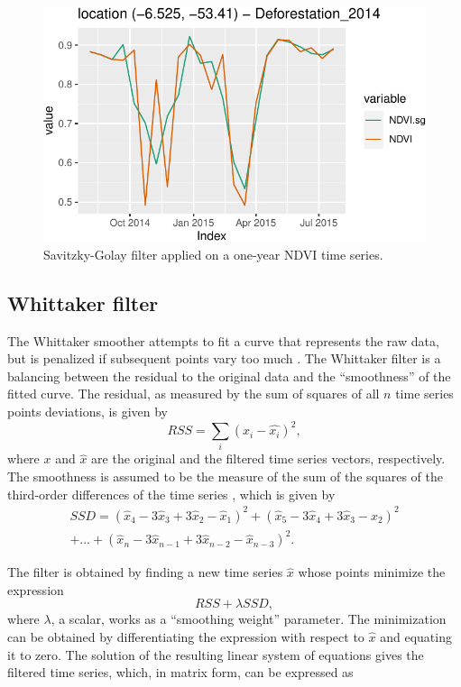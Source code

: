 \documentclass[a4paper,]{tufte-book}
\begin{document}
\begin{figure}

{\centering \includegraphics[width=0.7\linewidth]{sitsbook_files/figure-latex/unnamed-chunk-33-1} 

}

\caption[Savitzky-Golay filter applied on a one-year NDVI time series]{Savitzky-Golay filter applied on a one-year NDVI time series.}\label{fig:unnamed-chunk-33}
\end{figure}

\hypertarget{whittaker-filter}{%
\subsection{Whittaker filter}\label{whittaker-filter}}

The Whittaker smoother attempts to fit a curve that represents the raw data, but is penalized if subsequent points vary too much \citep{Atzberger2011}. The Whittaker filter is a balancing between the residual to the original data and the ``smoothness'' of the fitted curve. The residual, as measured by the sum of squares of all \(n\) time series points deviations, is given by
\[
  RSS=\sum_{i}(x_{i} - \hat{x_{i}})^2,
\]
where \(x\) and \(\hat{x}\) are the original and the filtered time series vectors, respectively. The smoothness is assumed to be the measure of the sum of the squares of the third-order differences of the time series \citep{Whittaker1922}, which is given by
\[
  \begin{split}
S\!S\!D = (\hat{x}_4 - 3\hat{x}_3 + 3\hat{x}_2 - \hat{x}_1)^2 + (\hat{x}_5 - 3\hat{x}_4 + 3\hat{x}_3 - \hat{x}_2)^2 \\ + \ldots + (\hat{x}_n - 3\hat{x}_{n-1} + 3\hat{x}_{n-2} - \hat{x}_{n-3})^2.
\end{split}
\]

The filter is obtained by finding a new time series \(\hat{x}\) whose points minimize the expression
\[
  RSS+\lambda{}S\!S\!D,
\]
where \(\lambda{}\), a scalar, works as a ``smoothing weight'' parameter. The minimization can be obtained by differentiating the expression with respect to \(\hat{x}\) and equating it to zero. The solution of the resulting linear system of equations gives the filtered time series, which, in matrix form, can be expressed as
\end{document}
